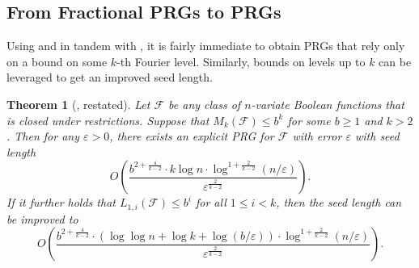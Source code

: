 \documentclass[10pt,a4paper]{article}
\newcommand{\eps}{\varepsilon}
\newtheorem{THM}[theorem]{Theorem}
\theoremstyle{definition}
\begin{document}
        \subsection{From Fractional PRGs to PRGs}
\label{sec:fprg2prg}
Using  and  in tandem with , it is fairly immediate to obtain PRGs that rely only on a bound on some $k$-th Fourier level.  Similarly, bounds on levels up to $k$ can be leveraged to get an improved seed length.

\begin{THM}[, restated]
\label{thm:combined}
Let $\mathcal{F}$ be any class of $n$-variate Boolean functions that is closed under restrictions. Suppose that $M_{k}(\mathcal{F})\leq b^{k}$ for some $b\geq 1$ and  $k> 2$. Then for any $\eps>0$, there exists an explicit PRG for $\mathcal{F}$ with error $\eps$ with seed length
\[
    O\left(\frac{b^{2+\frac{4}{k-2}}\cdot k \log n \cdot \log^{1+\frac{2}{k-2}}(n/\eps)}{\eps^{\frac{2}{k-2}}}\right).
\]
If it further holds that $L_{1,i}(\mathcal{F})\leq b^{i}$ for all $1\leq i<k$, then the seed length can be improved to 
\[
    O\left(\frac{b^{2+\frac{4}{k-2}}\cdot (\log\log n +\log k+\log(b/\eps))\cdot \log^{1+\frac{2}{k-2}}(n/\eps)}{\eps^{\frac{2}{k-2}}}\right).
\]
\end{THM}
\end{document}

